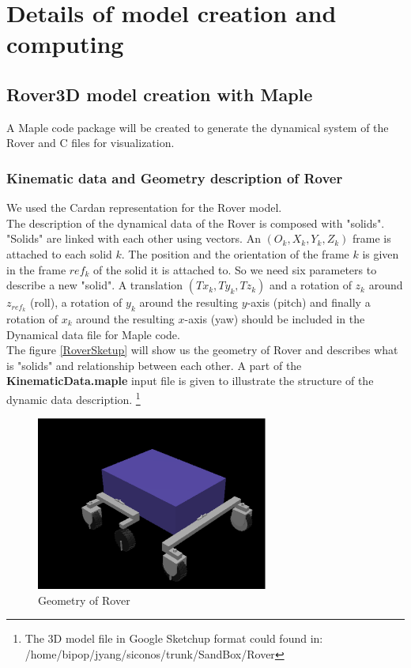 \chapter{Details of model creation and computing}
\section{Rover3D model creation with Maple}

A Maple code package will be created to generate the dynamical system of the Rover %
and C files for visualization.


\subsection{Kinematic data and Geometry description of Rover}

We used the Cardan representation for the Rover model.\\


The description of the dynamical data of the Rover is composed with "solids". "Solids" are linked with each other using vectors. An $(O_k, X_k, Y_k, Z_k)$ frame is attached to each solid $k$. The position and the orientation of the frame $k$ is given in the frame $ref_k$ of the solid it is attached to. So we need six parameters to describe a new "solid". A translation $(Tx_k, Ty_k, Tz_k)$ and a rotation of $z_k$ around
$z_{ref_k}$ (roll), a rotation of $y_k$ around the resulting $y$-axis (pitch) and finally a rotation of $x_k$ around the resulting $x$-axis
(yaw) should be included in the Dynamical data file for Maple code. \\

The figure \eqref{RoverSketup} will show us the geometry of Rover and describes what is "solids" and relationship between each other. A part of the \textbf{KinematicData.maple} input file is given to illustrate the structure of the dynamic data description. \footnote{The 3D model file in Google Sketchup format could found in: /home/bipop/jyang/siconos/trunk/SandBox/Rover}\\

\begin{figure}[H]
 \begin{center}
      \includegraphics[width=3in]{Chapter4/rovereps.eps}
    \caption{Geometry of Rover}
  \end{center}
\label{RoverSketup}
\end{figure}



